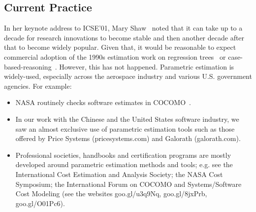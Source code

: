 \documentclass[smallcondesed]{svjour3}
\newcommand{\bi}{\begin{itemize}[leftmargin=0.4cm]}
\newcommand{\ei}{\end{itemize}}
\begin{document}
\subsection{Current Practice}
In her keynote address to ICSE'01, Mary Shaw~\cite{shaw01} noted that it can take up to a
decade  for  research innovations
to become stable and then another decade after that to become widely popular. Given that, it would be reasonable
to expect commercial adoption of  the 1990s estimation work
on  regression trees~\cite{shepperd97} or case-based-reasoning~\cite{shepperd97}. However, 
this has not happened.
Parametric estimation is
widely-used, especially across the aerospace
industry and various U.S. government agencies. For example:
\bi
\item
NASA routinely checks  software estimates 
in  COCOMO~\cite{dabney07}.  
\item
In our work with the Chinese and the United States software industry,
we saw an   almost exclusive
use  of parametric estimation tools such as those offered by 
Price Systems (pricesystems.com) and  Galorath (galorath.com).
\item
Professional societies, handbooks and
certification programs are mostly developed around 
parametric estimation methods and tools; e.g. see the 
International Cost Estimation and Analysis Society; the
NASA Cost Symposium;  the
International Forum on COCOMO and Systems/Software
Cost Modeling (see the websites goo.gl/u3q9Nq, goo.gl/8jxPrb, goo.gl/O01Pc6).
\ei





\end{document}
